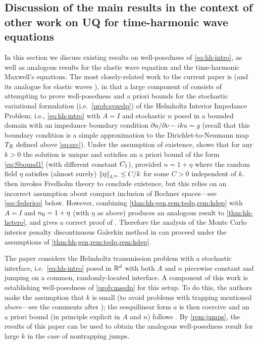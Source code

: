 \subsection{Discussion of the main results in the context of other work on UQ for time-harmonic wave equations}\label{sec:otherwork}

In this section we discuss existing results on well-posedness of \eqref{eq:hh-intro}, as well as analogous results for the elastic wave equation and the time-harmonic Maxwell's equations. The most closely-related work to the current paper is \cite{FeLiLo:15} (and its analogue for elastic waves \cite{FeLo:17}), in that a large component of \cite{FeLiLo:15} consists of attempting to prove well-posedness and a priori bounds for the stochastic variational formulation (i.e.~\cref{prob:svsedp}) of the Helmholtz Interior Impedance Problem; i.e., \eqref{eq:hh-intro} with $A=I$ and stochastic $n$ posed in a bounded domain with an impedance boundary condition $\partial u/\partial \nu - ik u = g$ (recall that this boundary condition is a simple approximation to the Dirichlet-to-Neumann map $T_{R}$ defined above \eqref{eq:src}). Under the assumption of existence, \cite{FeLiLo:15} shows that for any $k>0$ the solution is unique and satisfies an a priori bound of the form \eqref{eq:Sbound1} (with different constant $C_{1}$), provided $n=1+\eta$ where the random field $\eta$ satisfies (almost surely) $\N{\eta}_{L^\infty} \leq C/k$ for some $C>0$ independent of $k$. \cite{FeLiLo:15} then invokes Fredholm theory to conclude existence, but this relies on an incorrect assumption about compact inclusion of Bochner spaces---see \cref{sec:federico} below. However, combining \cref{thm:hh-gen,rem:tedp,rem:kdep} with $A=I$ and $n_{0}=1+\eta$ (with $\eta$ as above) produces an analogous result to \cref{thm:hh-hetero}, and gives a correct proof of \cite[Theorem 2.5]{FeLiLo:15}. Therefore the analysis of the Monte Carlo interior penalty discontinuous Galerkin method in \cite{FeLiLo:15} can proceed under the assumptions of \cref{thm:hh-gen,rem:tedp,rem:kdep}.

The paper \cite{HiScScSc:15} considers the Helmholtz transmission problem with a stochastic interface, i.e.~\eqref{eq:hh-intro} posed in $\mathbb R^{d}$ with both $A$ and $n$ piecewise constant and jumping on a common, randomly-located interface. A component of this work is establishing well-posedness of \cref{prob:msedp} for this setup. To do this, the authors make the assumption that $k$ is small (to avoid problems with trapping mentioned above---see the comments after \cite[Theorem 4.3]{HiScScSc:15}); the sesquilinear form $a$ is then coercive and an a priori bound (in principle explicit in $A$ and $n$) follows \cite[Lemma 4.5]{HiScScSc:15}. By \cref{rem:jumps}, the results of this paper can be used to obtain the analogous well-posedness result for large $k$ in the case of nontrapping jumps.

